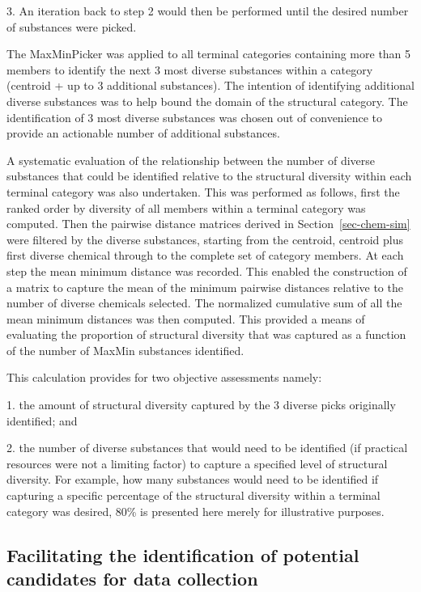 \documentclass[
  super,
  preprint,
  3p]{elsarticle}
\begin{document}
3. An iteration back to step 2 would then be performed until the desired
number of substances were picked.

The MaxMinPicker was applied to all terminal categories containing more
than 5 members to identify the next 3 most diverse substances within a
category (centroid + up to 3 additional substances). The intention of
identifying additional diverse substances was to help bound the domain
of the structural category. The identification of 3 most diverse
substances was chosen out of convenience to provide an actionable number
of additional substances.

A systematic evaluation of the relationship between the number of
diverse substances that could be identified relative to the structural
diversity within each terminal category was also undertaken. This was
performed as follows, first the ranked order by diversity of all members
within a terminal category was computed. Then the pairwise distance
matrices derived in Section~\ref{sec-chem-sim} were filtered by the
diverse substances, starting from the centroid, centroid plus first
diverse chemical through to the complete set of category members. At
each step the mean minimum distance was recorded. This enabled the
construction of a matrix to capture the mean of the minimum pairwise
distances relative to the number of diverse chemicals selected. The
normalized cumulative sum of all the mean minimum distances was then
computed. This provided a means of evaluating the proportion of
structural diversity that was captured as a function of the number of
MaxMin substances identified.

This calculation provides for two objective assessments namely:

1. the amount of structural diversity captured by the 3 diverse picks
originally identified; and

2. the number of diverse substances that would need to be identified (if
practical resources were not a limiting factor) to capture a specified
level of structural diversity. For example, how many substances would
need to be identified if capturing a specific percentage of the
structural diversity within a terminal category was desired, 80\% is
presented here merely for illustrative purposes.

\hypertarget{facilitating-the-identification-of-potential-candidates-for-data-collection}{%
\subsection{Facilitating the identification of potential candidates for
data
collection}\label{facilitating-the-identification-of-potential-candidates-for-data-collection}}
\end{document}
